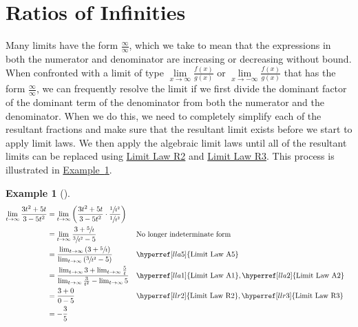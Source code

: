 \documentclass[12pt,]{book}
\theoremstyle{plain}
\theoremstyle{definition}
\theoremstyle{definition}
\theoremstyle{definition}
\newtheorem{example}[theorem]{Example}
\theoremstyle{definition}
\theoremstyle{definition}
\numberwithin{equation}{section}
\newcommand{\fe}[2]{#1\mathopen{}\left(#2\right)\mathclose{}}
\begin{document}
\section[{Ratios of Infinities}]{Ratios of Infinities}\label{section-ratios-of-infinities}
Many limits have the form \(\frac{\infty}{\infty}\), which we take to mean that the expressions in both the numerator and denominator are increasing or decreasing without bound. When confronted with a limit of type \(\lim\limits_{x\to\infty}\frac{\fe{f}{x}}{\fe{g}{x}}\) or \(\lim\limits_{x\to-\infty}\frac{\fe{f}{x}}{\fe{g}{x}}\) that has the form \(\frac{\infty}{\infty}\), we can frequently resolve the limit if we first divide the dominant factor of the dominant term of the denominator from both the numerator and the denominator. When we do this, we need to completely simplify each of the resultant fractions and make sure that the resultant limit exists before we start to apply limit laws. We then apply the algebraic limit laws until all of the resultant limits can be replaced using \hyperref[llr2]{Limit Law R2} and \hyperref[llr3]{Limit Law R3}. This process is illustrated in \hyperref[example-ratio-of-infinities]{Example~\ref{example-ratio-of-infinities}}.%
\begin{example}[]\label{example-ratio-of-infinities}
\begin{align*}
\lim_{t\to\infty}\frac{3t^2+5t}{3-5t^2}&=\lim_{t\to\infty}\left(\frac{3t^2+5t}{3-5t^2}\cdot\frac{\sfrac{1}{t^2}}{\sfrac{1}{t^2}}\right)\\
&=\lim_{t\to\infty}\frac{3+\sfrac{5}{t}}{\sfrac{3}{t^2}-5}&&\text{No longer indeterminate form}\\
&=\frac{\lim_{t\to\infty}\left(3+\sfrac{5}{t}\right)}{\lim_{t\to\infty}\left(\sfrac{3}{t^2}-5\right)}&&\hyperref[lla5]{\text{Limit Law A5}}\\
&=\frac{\lim_{t\to\infty}3+\lim_{t\to\infty}\frac{5}{t}}{\lim_{t\to\infty}\frac{3}{t^2}-\lim_{t\to\infty}5}&&\hyperref[lla1]{\text{Limit Law A1}}, \hyperref[lla2]{\text{Limit Law A2}}\\
&=\frac{3+0}{0-5}&&\hyperref[llr2]{\text{Limit Law R2}}, \hyperref[llr3]{\text{Limit Law R3}}\\
&=-\frac{3}{5}
\end{align*}%
\end{example}
\typeout{************************************************}
\typeout{************************************************}
\end{document}
